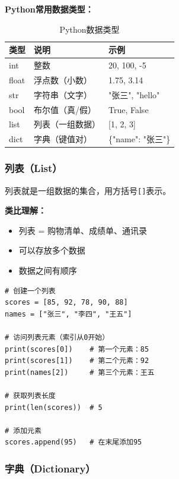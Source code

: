 \documentclass[12pt,a4paper]{article}
\begin{document}
\textbf{Python常用数据类型：}

\begin{table}[H]
\centering
\caption{Python数据类型}
\begin{tabular}{|l|l|l|}
\hline
\textbf{类型} & \textbf{说明} & \textbf{示例} \\
\hline
int & 整数 & 20, 100, -5 \\
\hline
float & 浮点数（小数） & 1.75, 3.14 \\
\hline
str & 字符串（文字） & "张三", "hello" \\
\hline
bool & 布尔值（真/假） & True, False \\
\hline
list & 列表（一组数据） & [1, 2, 3] \\
\hline
dict & 字典（键值对） & \{"name": "张三"\} \\
\hline
\end{tabular}
\end{table}

\subsubsection{列表（List）}

\begin{knowledgebox}
列表就是一组数据的集合，用方括号\texttt{[]}表示。

\textbf{类比理解：}
\begin{itemize}
    \item 列表 = 购物清单、成绩单、通讯录
    \item 可以存放多个数据
    \item 数据之间有顺序
\end{itemize}
\end{knowledgebox}

\begin{lstlisting}[caption={列表示例}]
# 创建一个列表
scores = [85, 92, 78, 90, 88]
names = ["张三", "李四", "王五"]

# 访问列表元素（索引从0开始）
print(scores[0])    # 第一个元素：85
print(scores[1])    # 第二个元素：92
print(names[2])     # 第三个元素：王五

# 获取列表长度
print(len(scores))  # 5

# 添加元素
scores.append(95)   # 在末尾添加95
\end{lstlisting}

\subsubsection{字典（Dictionary）}
\end{document}
